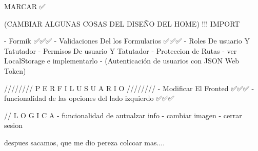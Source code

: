 
MARCAR ✅

(CAMBIAR ALGUNAS COSAS DEL DISEÑO DEL HOME) !!! IMPORT 

    - Formik ✅✅✅
    - Validaciones Del los Formularios ✅✅✅
    - Roles De usuario Y Tatutador 
    - Permisos De usuario Y Tatutador
    - Proteccion de Rutas
    - ver LocalStorage e implementarlo
    - (Autenticación de usuarios con JSON Web Token)


////////   P E R F I L   U S U A R I O   ////////  
    - Modificar El Fronted ✅✅✅
    - funcionalidad de las opciones del lado izquierdo ✅✅✅

    // L O G I C A
    - funcionalidad de autualzar info 
    - cambiar imagen
    - cerrar sesion 

despues sacamos, que me dio pereza colcoar mas....


